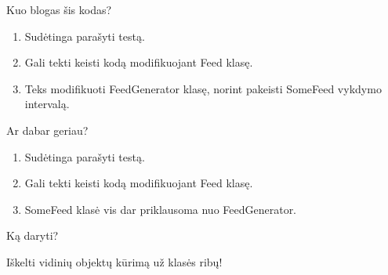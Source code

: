 \documentclass[12pt,a4paper]{beamer}
\begin{document}
\begin{frame}[fragile]{Kuo blogas šis kodas?}
\pause
\begin{enumerate}
    \item Sudėtinga parašyti testą.
    \item Gali tekti keisti kodą modifikuojant Feed klasę.
    \item Teks modifikuoti FeedGenerator klasę, norint pakeisti SomeFeed vykdymo intervalą.
\end{enumerate}
\end{frame}

\begin{frame}[fragile]{Ar dabar geriau?}
\pause
\begin{enumerate}
    \item Sudėtinga parašyti testą.
    \item Gali tekti keisti kodą modifikuojant Feed klasę.
    \item SomeFeed klasė vis dar priklausoma nuo FeedGenerator.
\end{enumerate}
\end{frame}


\begin{frame}[fragile]{Ką daryti?}
    \begin{center}
        {\Huge Iškelti vidinių objektų kūrimą už klasės ribų!}
    \end{center}
\end{frame}
\end{document}
